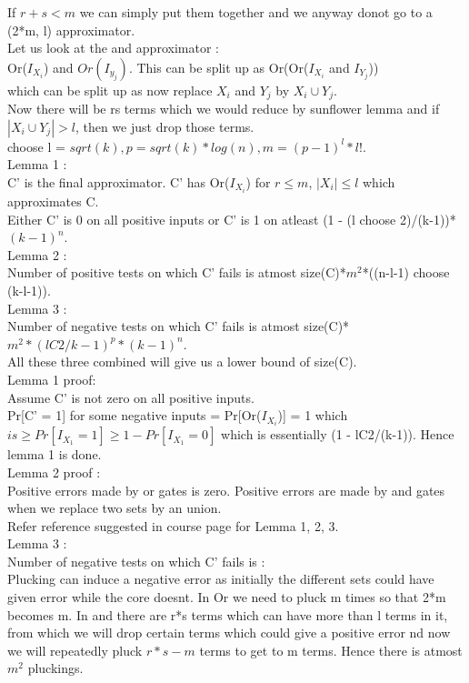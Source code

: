 \documentclass[solution,addpoints,12pt]{exam}
\begin{document}
If $r+s < m$ we can simply put them together and we anyway donot
go to a (2*m, l) approximator.\\

Let us look at the and approximator :\\
Or($I_{X_i}$) and $Or(I_{y_j})$. This can be split up as
Or(Or($I_{X_i}$ and $I_{Y_j}$))\\
which can be split up as now replace $X_i$ and $Y_j$ by $X_i \cup Y_j$.\\
Now there will be rs terms which we would reduce by sunflower lemma and
if $|X_i \cup Y_j| > l$, then we just drop those terms.\\
choose l = $sqrt(k), p = sqrt(k)*log(n), m = (p-1)^l*l!$.\\
Lemma 1 :\\
C' is the final approximator.
C' has Or($I_{X_i}$) for $r \le m$, $|X_i| \le l$ which approximates C.\\
Either C' is 0 on all positive inputs or C' is 1 on atleast
(1 - (l choose 2)/(k-1))*${(k-1)}^n$.\\
Lemma 2 :\\
Number of positive tests on which C' fails is atmost size(C)*$m^2$*((n-l-1) choose (k-l-1)).\\
Lemma 3 :\\
Number of negative tests on which C' fails is atmost size(C)*$m^2*{(lC2/k-1)}^p*(k-1)^n$.\\
All these three combined will give us a lower bound of size(C).\\

Lemma 1 proof:\\
Assume C' is not zero on all positive inputs.\\
Pr[C' = 1] for some negative inputs = Pr[Or($I_{X_i}$)] = 1
which $is \ge Pr[I_{X_1} = 1] \ge 1 - Pr[I_{X_1} = 0]$ which
is essentially (1 - lC2/(k-1)). Hence lemma 1 is done.\\

Lemma 2 proof :\\
Positive errors made by or gates is zero. Positive errors are
made by and gates when we replace two sets by an union.\\

Refer reference suggested in course page for Lemma 1, 2, 3.\\

Lemma 3 :\\
Number of negative tests on which C' fails is :\\
Plucking can induce a negative error as initially the different sets could
have given error while the core doesnt. In Or we need to pluck m times
so that 2*m becomes m. In and there are r*s terms which can have more than
l terms in it, from which we will drop certain terms which could give a
positive error nd now we will repeatedly pluck $r*s-m$ terms to get to
m terms. Hence there is atmost $m^2$ pluckings.\\
\end{document}
